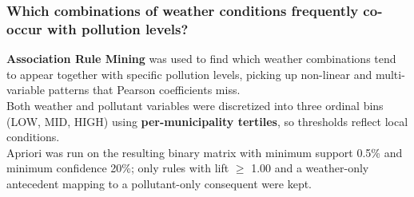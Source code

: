 \documentclass{article}
\begin{document}
	\newpage
	\subsubsection{Which combinations of weather conditions frequently co-occur with pollution levels?}

	\textbf{Association Rule Mining} was used to find which weather combinations tend to appear together with specific pollution levels, picking up non-linear and multi-variable patterns that Pearson coefficients miss.\\
	Both weather and pollutant variables were discretized into three ordinal bins (LOW, MID, HIGH) using \textbf{per-municipality tertiles}, so thresholds reflect local conditions.\\
	Apriori was run on the resulting binary matrix with minimum support 0.5\% and minimum confidence 20\%; only rules with lift $\geq$ 1.00 and a weather-only antecedent mapping to a pollutant-only consequent were kept.
\end{document}

